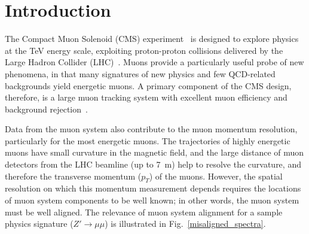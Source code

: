 \maketitle

\thispagestyle{fancy}


\section{Introduction}

The Compact Muon Solenoid (CMS) experiment~\cite{cms} is designed to
explore physics at the TeV energy scale, exploiting proton-proton
collisions delivered by the Large Hadron Collider (LHC)~\cite{lhc}.
Muons provide a particularly useful probe of new phenomena, in that
many signatures of new physics and few QCD-related backgrounds yield
energetic muons.  A primary component of the CMS design, therefore, is
a large muon tracking system with excellent muon efficiency and
background rejection~\cite{mutdr}.

Data from the muon system also contribute to the muon momentum
resolution, particularly for the most energetic muons.  The
trajectories of highly energetic muons have small curvature in the
magnetic field, and the large distance of muon detectors from the LHC
beamline (up to 7~m) help to resolve the curvature, and therefore the
transverse momentum ($p_T$) of the muons.  However, the spatial
resolution on which this momentum measurement depends requires the
locations of muon system components to be well known; in other words,
the muon system must be well aligned.  The relevance of muon system
alignment for a sample physics signature ($Z' \to \mu\mu$) is
illustrated in Fig.~\ref{misaligned_spectra}.

